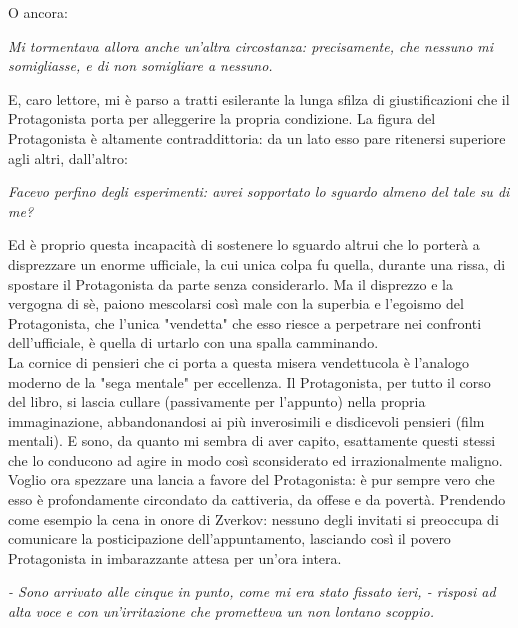 \documentclass[12pt,a4paper]{report}
\theoremstyle{definition}
\theoremstyle{Theorem}
\theoremstyle{definition}
\theoremstyle{definition}
\theoremstyle{definition}
\begin{document}
 O ancora: 
 \begin{center}
 	\textit{Mi tormentava allora anche un'altra circostanza: precisamente, che nessuno mi somigliasse, e di non somigliare a nessuno.}
 \end{center}
E, caro lettore, mi è parso a tratti esilerante la lunga sfilza di giustificazioni che il Protagonista porta per alleggerire la propria condizione. La figura del Protagonista è altamente contraddittoria: da un lato esso pare ritenersi superiore agli altri, dall'altro:
\begin{center}
	\textit{Facevo perfino degli esperimenti: avrei sopportato lo sguardo almeno del tale su di me?}
\end{center}
Ed è proprio questa incapacità di sostenere lo sguardo altrui che lo porterà a disprezzare un enorme ufficiale, la cui unica colpa fu quella, durante una rissa, di spostare il Protagonista da parte senza considerarlo. Ma il disprezzo e la vergogna di sè, paiono mescolarsi così male con la superbia e l'egoismo del Protagonista, che l'unica "vendetta" che esso riesce a perpetrare nei confronti dell'ufficiale, è quella di urtarlo con una spalla camminando.\\
La cornice di pensieri che ci porta a questa misera vendettucola è l'analogo moderno de la "sega mentale" per eccellenza. Il Protagonista, per tutto il corso del libro, si lascia cullare (passivamente per l'appunto) nella propria immaginazione, abbandonandosi ai più inverosimili e disdicevoli pensieri (film mentali). E sono, da quanto mi sembra di aver capito, esattamente questi stessi che lo conducono ad agire in modo così sconsiderato ed irrazionalmente maligno.\\
Voglio ora spezzare una lancia a favore del Protagonista: è pur sempre vero che esso è profondamente circondato da cattiveria, da offese e da povertà. Prendendo come esempio la cena in onore di Zverkov: nessuno degli invitati si preoccupa di comunicare la posticipazione dell'appuntamento, lasciando così il povero Protagonista in imbarazzante attesa per un'ora intera.
\begin{center}
	\textit{- Sono arrivato alle cinque in punto, come mi era stato fissato ieri, - risposi ad alta voce e con un'irritazione che prometteva un non lontano scoppio.}
\end{center}
\end{document}
